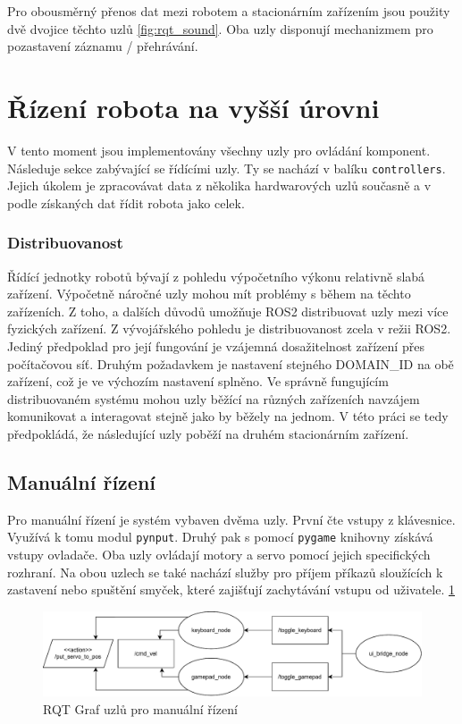 Pro obousměrný přenos dat mezi robotem a stacionárním zařízením jsou použity dvě dvojice těchto uzlů \ref{fig:rqt_sound}. Oba uzly disponují mechanizmem pro pozastavení záznamu / přehrávání. 

\section{Řízení robota na vyšší úrovni}
V tento moment jsou implementovány všechny uzly pro ovládání komponent. Následuje sekce zabývající se řídícími uzly. Ty se nachází v balíku \verb|controllers|. Jejich úkolem je zpracovávat data z několika hardwarových uzlů současně a v podle získaných dat řídit robota jako celek.

\subsubsection{Distribuovanost}
Řídící jednotky robotů bývají z pohledu výpočetního výkonu relativně slabá zařízení. Výpočetně náročné uzly mohou mít problémy s během na těchto zařízeních. Z toho, a dalších důvodů umožňuje ROS2 distribuovat uzly mezi více fyzických zařízení. Z vývojářského pohledu je distribuovanost zcela v režii ROS2. Jediný předpoklad pro její fungování je vzájemná dosažitelnost zařízení přes počítačovou síť. Druhým požadavkem je nastavení stejného DOMAIN\_ID na obě zařízení, což je ve výchozím nastavení splněno. Ve správně fungujícím distribuovaném systému mohou uzly běžící na různých zařízeních navzájem komunikovat a interagovat stejně jako by běžely na jednom. V této práci se tedy předpokládá, že následující uzly poběží na druhém stacionárním zařízení. 

\subsection*{Manuální řízení}
Pro manuální řízení je systém vybaven dvěma uzly. První čte vstupy z klávesnice. Využívá k tomu modul \verb|pynput|. Druhý pak s pomocí \verb|pygame| knihovny získává vstupy ovladače. Oba uzly ovládají motory a servo pomocí jejich specifických rozhraní. Na obou uzlech se také nachází služby pro příjem příkazů sloužících k zastavení nebo spuštění smyček, které zajišťují zachytávání vstupu od uživatele. \ref{fig:rqt_manual}

\begin{figure}[h!]
	\centering
	\includegraphics[scale=0.75]{obrazky-figures/manual_control_diagram.pdf}
	\caption{RQT Graf uzlů pro manuální řízení}
	\label{fig:rqt_manual}
\end{figure}

